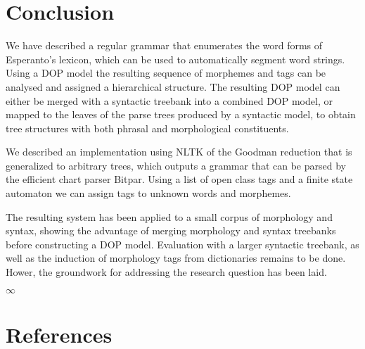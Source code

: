 \documentclass[10pt,a4paper]{article}
\begin{document}
\section{Conclusion}

We have described a regular grammar that enumerates the word forms of
Esperanto's lexicon, which can be used to automatically segment word strings.
Using a DOP model the resulting sequence of morphemes and tags can be analysed
and assigned a hierarchical structure. The resulting DOP model can either be
merged with a syntactic treebank into a combined DOP model, or mapped to the
leaves of the parse trees produced by a syntactic model, to obtain tree
structures with both phrasal and morphological constituents.

We described an implementation using NLTK of the Goodman reduction that is
generalized to arbitrary trees, which outputs a grammar that can be parsed by
the efficient chart parser Bitpar. Using a list of open class tags and a
finite state automaton we can assign tags to unknown words and
morphemes.

The resulting system has been applied to a small corpus of morphology and
syntax, showing the advantage of merging morphology and syntax treebanks
before constructing a DOP model. Evaluation with a larger syntactic treebank,
as well as the induction of morphology tags from dictionaries remains to be
done. Hower, the groundwork for addressing the research question has been laid.

\begin{center}
$\infty$
\end{center}

\section{References}
\end{document}
